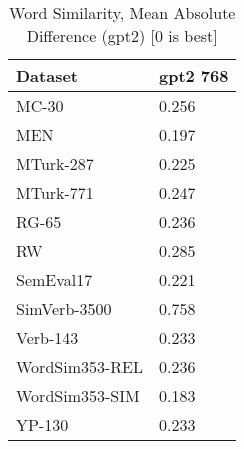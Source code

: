 \begin{table}[]
\centering
\begin{tabular}{l|l}
\hline
Dataset & gpt2 768 \\
\hline
MC-30 & 0.256 \\ 
MEN & 0.197 \\ 
MTurk-287 & 0.225 \\ 
MTurk-771 & 0.247 \\ 
RG-65 & 0.236 \\ 
RW & 0.285 \\ 
SemEval17 & 0.221 \\ 
SimVerb-3500 & 0.758 \\ 
Verb-143 & 0.233 \\ 
WordSim353-REL & 0.236 \\ 
WordSim353-SIM & 0.183 \\ 
YP-130 & 0.233
\end{tabular}
\caption{Word Similarity, Mean Absolute Difference (gpt2) [0 is best]}
\label{tab:similarity-gpt2}
\end{table}
